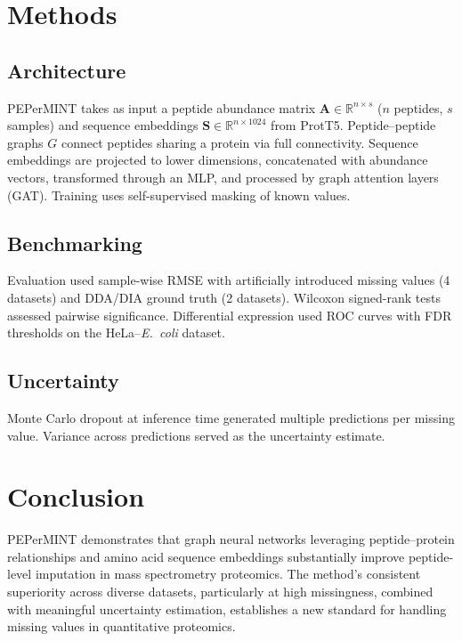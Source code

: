 \documentclass[11pt]{article}
\begin{document}
\section{Methods}

\subsection{Architecture}
PEPerMINT takes as input a peptide abundance matrix $\mathbf{A} \in \mathbb{R}^{n \times s}$ ($n$ peptides, $s$ samples) and sequence embeddings $\mathbf{S} \in \mathbb{R}^{n \times 1024}$ from ProtT5. Peptide--peptide graphs $G$ connect peptides sharing a protein via full connectivity. Sequence embeddings are projected to lower dimensions, concatenated with abundance vectors, transformed through an MLP, and processed by graph attention layers (GAT). Training uses self-supervised masking of known values.

\subsection{Benchmarking}
Evaluation used sample-wise RMSE with artificially introduced missing values (4 datasets) and DDA/DIA ground truth (2 datasets). Wilcoxon signed-rank tests assessed pairwise significance. Differential expression used ROC curves with FDR thresholds on the HeLa--\textit{E.\ coli} dataset.

\subsection{Uncertainty}
Monte Carlo dropout at inference time generated multiple predictions per missing value. Variance across predictions served as the uncertainty estimate.

\section{Conclusion}

PEPerMINT demonstrates that graph neural networks leveraging peptide--protein relationships and amino acid sequence embeddings substantially improve peptide-level imputation in mass spectrometry proteomics. The method's consistent superiority across diverse datasets, particularly at high missingness, combined with meaningful uncertainty estimation, establishes a new standard for handling missing values in quantitative proteomics.



\end{document}
